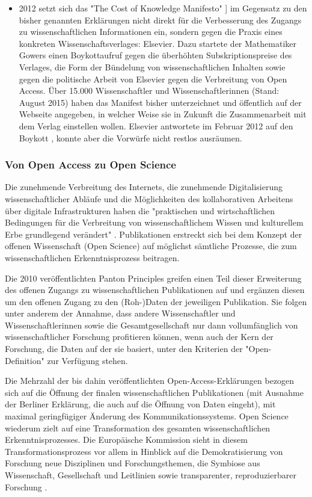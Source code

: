 \begin{itemize}
\item 2012 setzt sich das "The Cost of Knowledge Manifesto" \cite{Gowers_2012} ] im Gegensatz zu den bisher genannten Erklärungen nicht direkt für die Verbesserung des Zugangs zu wissenschaftlichen Informationen ein, sondern gegen die Praxis eines konkreten Wissenschaftsverlages: Elsevier. Dazu startete der Mathematiker Gowers einen Boykottaufruf gegen die überhöhten Subskriptionspreise des Verlages, die Form der Bündelung von wissenschaftlichen Inhalten sowie gegen die politische Arbeit von Elsevier gegen die Verbreitung von Open Access. Über 15.000 Wissenschaftler und Wissenschaftlerinnen (Stand: August 2015) haben das Manifest bisher unterzeichnet und öffentlich auf der Webseite angegeben, in welcher Weise sie in Zukunft die Zusammenarbeit mit dem Verlag einstellen wollen. Elsevier antwortete im Februar 2012 auf den Boykott \cite{Elsevier_2012}, konnte aber die Vorwürfe nicht restlos ausräumen.
\end{itemize}

\subsubsection{Von Open Access zu Open Science}

Die zunehmende Verbreitung des Internets, die zunehmende Digitalisierung wissenschaftlicher Abläufe und die Möglichkeiten des kollaborativen Arbeitens über digitale Infrastrukturen haben die "praktischen und wirtschaftlichen Bedingungen für die Verbreitung von wissenschaftlichem Wissen und kulturellem Erbe grundlegend verändert" \cite{Berliner_Erklaerung_2003}. Publikationen erstreckt sich bei dem Konzept der offenen Wissenschaft (Open Science) auf möglichst sämtliche Prozesse, die zum wissenschaftlichen Erkenntnisprozess beitragen.

Die 2010 veröffentlichten Panton Principles \cite{Murray-Rust_2015} greifen einen Teil dieser Erweiterung des offenen Zugangs zu wissenschaftlichen Publikationen auf und ergänzen diesen um den offenen Zugang zu den (Roh-)Daten der jeweiligen Publikation. Sie folgen unter anderem der Annahme, dass andere Wissenschaftler und Wissenschaftlerinnen sowie die Gesamtgesellschaft nur dann vollumfänglich von wissenschaftlicher Forschung profitieren können, wenn auch der Kern der Forschung, die Daten auf der sie basiert, unter den Kriterien der "Open-Definition" \cite{Open_Definition_2014} zur Verfügung stehen.

Die Mehrzahl der bis dahin veröffentlichten Open-Access-Erklärungen bezogen sich auf die Öffnung der finalen wissenschaftlichen Publikationen (mit Ausnahme der Berliner Erklärung, die auch auf die Öffnung von Daten eingeht), mit maximal geringfügiger Änderung des Kommunikationssystems. Open Science wiederum zielt auf eine Transformation des gesamten wissenschaftlichen Erkenntnisprozesses. Die Europäische Kommission sieht in diesem Transformationsprozess vor allem in Hinblick auf die Demokratisierung von Forschung neue Disziplinen und Forschungsthemen, die Symbiose aus Wissenschaft, Gesellschaft und Leitlinien sowie transparenter, reproduzierbarer Forschung \cite{European_Commission_2015a}.

